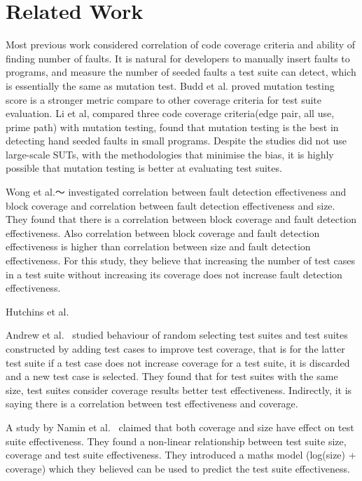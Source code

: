 \section{Related Work}
\label{sec:related}
Most previous work considered correlation of code coverage criteria and ability of finding number of faults. It is natural for developers to manually insert faults to programs, and measure the number of seeded faults a test suite can detect, which is essentially the same as mutation test. Budd et al. proved mutation testing score is a stronger metric compare to other coverage criteria for test suite evaluation. Li et al, compared three code coverage criteria(edge pair, all use, prime path) with mutation testing, found that mutation testing is the best in detecting hand seeded faults in small programs. Despite the studies did not use large-scale SUTs, with the methodologies that minimise the bias, it is highly possible that mutation testing is better at evaluating test suites.

Wong et al.～\cite{wong1994effect} investigated correlation between fault detection effectiveness and block coverage and correlation between fault detection effectiveness and size. They found that there is a correlation between block coverage and fault detection effectiveness. Also correlation between block coverage and fault detection effectiveness is higher than correlation between size and fault detection effectiveness. For this study, they believe that increasing the number of test cases in a test suite without increasing its coverage does not increase fault detection effectiveness.

Hutchins et al.~\cite{hutchins1994experiments} 

Andrew et al.~\cite{andrews2006using} studied behaviour of random selecting test suites and test suites constructed by adding test cases to improve test coverage, that is for the latter test suite if a test case does not increase coverage for a test suite, it is discarded and a new test case is selected. They found that for test suites with the same size, test suites consider coverage results better test effectiveness. Indirectly, it is saying there is a correlation between test effectiveness and coverage.

A study by Namin et al.~\cite{namin2009influence} claimed that both coverage and size have effect on test suite effectiveness. They found a non-linear relationship between test suite size, coverage and test suite effectiveness. They introduced a maths model (log(size) + coverage) which they believed can be used to predict the test suite effectiveness.

